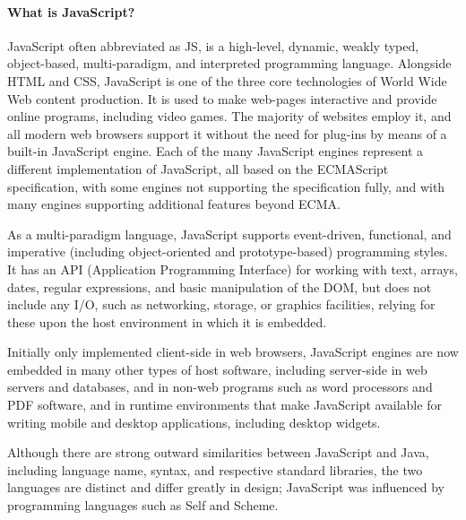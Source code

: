 \documentclass{article}
\begin{document}
\paragraph{What is JavaScript?}
JavaScript often abbreviated as JS, is a high-level, dynamic, weakly typed, object-based, multi-paradigm, and interpreted programming language. Alongside HTML and CSS, JavaScript is one of the three core technologies of World Wide Web content production. It is used to make web-pages interactive and provide online programs, including video games. The majority of websites employ it, and all modern web browsers support it without the need for plug-ins by means of a built-in JavaScript engine. Each of the many JavaScript engines represent a different implementation of JavaScript, all based on the ECMAScript specification, with some engines not supporting the specification fully, and with many engines supporting additional features beyond ECMA.
	
As a multi-paradigm language, JavaScript supports event-driven, functional, and imperative (including object-oriented and prototype-based) programming styles. It has an API (Application Programming Interface) for working with text, arrays, dates, regular expressions, and basic manipulation of the DOM, but does not include any I/O, such as networking, storage, or graphics facilities, relying for these upon the host environment in which it is embedded.
	
Initially only implemented client-side in web browsers, JavaScript engines are now embedded in many other types of host software, including server-side in web servers and databases, and in non-web programs such as word processors and PDF software, and in runtime environments that make JavaScript available for writing mobile and desktop applications, including desktop widgets.
	
Although there are strong outward similarities between JavaScript and Java, including language name, syntax, and respective standard libraries, the two languages are distinct and differ greatly in design; JavaScript was influenced by programming languages such as Self and Scheme.
	
\end{document}
